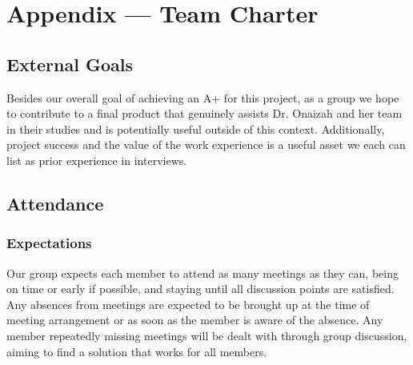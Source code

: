 \documentclass{article}
\begin{document}
\newpage{}

\section*{Appendix --- Team Charter}

\iffalse
\wss{borrows from
\href{https://engineering.up.edu/industry_partnerships/files/team-charter.pdf}
{University of Portland Team Charter}}
\fi

\subsection*{External Goals}

\iffalse
\wss{What are your team's external goals for this project? These are not the
goals related to the functionality or quality fo the project.  These are the
goals on what the team wishes to achieve with the project.  Potential goals are
to win a prize at the Capstone EXPO, or to have something to talk about in
interviews, or to get an A+, etc.}
\fi

Besides our overall goal of achieving an A+ for this project, as a group we hope to 
contribute to a final product that genuinely assists Dr. Onaizah and her team in their 
studies and is potentially useful outside of this context. Additionally, project success 
and the value of the work experience is a useful asset we each can list as prior 
experience in interviews. 

\subsection*{Attendance}

\subsubsection*{Expectations}

\iffalse
\wss{What are your team's expectations regarding meeting attendance (being on
time, leaving early, missing meetings, etc.)?}
\fi

Our group expects each member to attend as many meetings as they can, being on time 
or early if possible, and staying until all discussion points are satisfied. Any 
absences from meetings are expected to be brought up at the time of meeting arrangement 
or as soon as the member is aware of the absence. Any member repeatedly missing meetings 
will be dealt with through group discussion, aiming to find a solution that works for all members.
\end{document}
